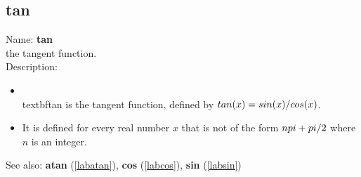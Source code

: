 \subsection{tan}
\label{labtan}
\noindent Name: \textbf{tan}\\
the tangent function.\\
\noindent Description: \begin{itemize}

\item \\textbf{tan} is the tangent function, defined by $\\tan(x) = \\sin(x)/\\cos(x)$.\n
\item It is defined for every real number $x$ that is not of the form $n\\pi + \\pi/2$ where $n$ is an integer.\n\end{itemize}
See also: \textbf{atan} (\ref{labatan}), \textbf{cos} (\ref{labcos}), \textbf{sin} (\ref{labsin})
